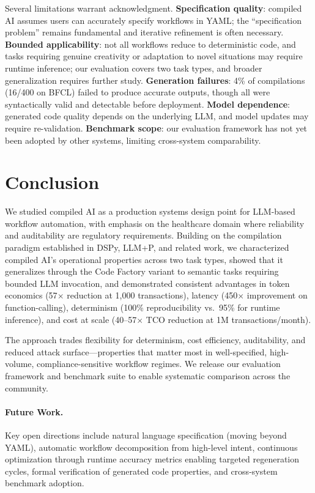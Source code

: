 \documentclass[11pt]{article}
\begin{document}
Several limitations warrant acknowledgment. \textbf{Specification quality}: compiled AI assumes users can accurately specify workflows in YAML; the ``specification problem'' remains fundamental and iterative refinement is often necessary. \textbf{Bounded applicability}: not all workflows reduce to deterministic code, and tasks requiring genuine creativity or adaptation to novel situations may require runtime inference; our evaluation covers two task types, and broader generalization requires further study. \textbf{Generation failures}: 4\% of compilations (16/400 on BFCL) failed to produce accurate outputs, though all were syntactically valid and detectable before deployment. \textbf{Model dependence}: generated code quality depends on the underlying LLM, and model updates may require re-validation. \textbf{Benchmark scope}: our evaluation framework has not yet been adopted by other systems, limiting cross-system comparability.

\section{Conclusion}
\label{sec:conclusion}

We studied compiled AI as a production systems design point for LLM-based workflow automation, with emphasis on the healthcare domain where reliability and auditability are regulatory requirements. Building on the compilation paradigm established in DSPy, LLM+P, and related work, we characterized compiled AI's operational properties across two task types, showed that it generalizes through the Code Factory variant to semantic tasks requiring bounded LLM invocation, and demonstrated consistent advantages in token economics (57$\times$ reduction at 1,000 transactions), latency (450$\times$ improvement on function-calling), determinism (100\% reproducibility vs.\ 95\% for runtime inference), and cost at scale (40--57$\times$ TCO reduction at 1M transactions/month).

The approach trades flexibility for determinism, cost efficiency, auditability, and reduced attack surface---properties that matter most in well-specified, high-volume, compliance-sensitive workflow regimes. We release our evaluation framework and benchmark suite to enable systematic comparison across the community.

\paragraph{Future Work.} Key open directions include natural language specification (moving beyond YAML), automatic workflow decomposition from high-level intent, continuous optimization through runtime accuracy metrics enabling targeted regeneration cycles, formal verification of generated code properties, and cross-system benchmark adoption.
\end{document}
